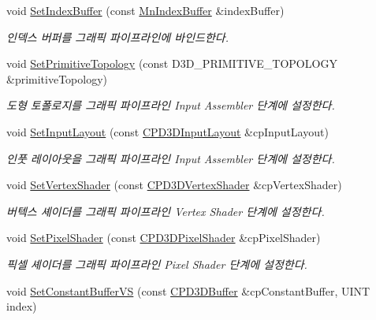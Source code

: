 \begin{DoxyCompactItemize}
void \hyperlink{class_m_n_l_1_1_mn_render_a_p_i_a59cab952055a4c763cefe8be9a213b8b}{Set\+Index\+Buffer} (const \hyperlink{class_m_n_l_1_1_mn_index_buffer}{Mn\+Index\+Buffer} \&index\+Buffer)
\begin{DoxyCompactList}\small\item\em 인덱스 버퍼를 그래픽 파이프라인에 바인드한다. \end{DoxyCompactList}\item 
void \hyperlink{class_m_n_l_1_1_mn_render_a_p_i_ade0c9d037798ea2ff940c9eafda403b7}{Set\+Primitive\+Topology} (const D3\+D\+\_\+\+P\+R\+I\+M\+I\+T\+I\+V\+E\+\_\+\+T\+O\+P\+O\+L\+O\+GY \&primitive\+Topology)
\begin{DoxyCompactList}\small\item\em 도형 토폴로지를 그래픽 파이프라인 Input Assembler 단계에 설정한다. \end{DoxyCompactList}\item 
void \hyperlink{class_m_n_l_1_1_mn_render_a_p_i_a1c279cbdd724db75c9b46a235a4eefc3}{Set\+Input\+Layout} (const \hyperlink{namespace_m_n_l_aec7a2a132d6e72492d5feb5926d838dd}{C\+P\+D3\+D\+Input\+Layout} \&cp\+Input\+Layout)
\begin{DoxyCompactList}\small\item\em 인풋 레이아웃을 그래픽 파이프라인 Input Assembler 단계에 설정한다. \end{DoxyCompactList}\item 
void \hyperlink{class_m_n_l_1_1_mn_render_a_p_i_a14436db58cba8d81570cb77f46f6e240}{Set\+Vertex\+Shader} (const \hyperlink{namespace_m_n_l_a8036d713226061c4827b537821fbf79b}{C\+P\+D3\+D\+Vertex\+Shader} \&cp\+Vertex\+Shader)
\begin{DoxyCompactList}\small\item\em 버텍스 셰이더를 그래픽 파이프라인 Vertex Shader 단계에 설정한다. \end{DoxyCompactList}\item 
void \hyperlink{class_m_n_l_1_1_mn_render_a_p_i_a96382bb557949573afd9a1c10eb3e11c}{Set\+Pixel\+Shader} (const \hyperlink{namespace_m_n_l_a4d6bd408e6e19137a03728583296f12a}{C\+P\+D3\+D\+Pixel\+Shader} \&cp\+Pixel\+Shader)
\begin{DoxyCompactList}\small\item\em 픽셀 셰이더를 그래픽 파이프라인 Pixel Shader 단계에 설정한다. \end{DoxyCompactList}\item 
void \hyperlink{class_m_n_l_1_1_mn_render_a_p_i_a52a0598b6ec9617a3019dfa844eab208}{Set\+Constant\+Buffer\+VS} (const \hyperlink{namespace_m_n_l_aab9c90a8c27ac6410a9cc7cd89efeef1}{C\+P\+D3\+D\+Buffer} \&cp\+Constant\+Buffer, U\+I\+NT index)

\end{DoxyCompactItemize}
